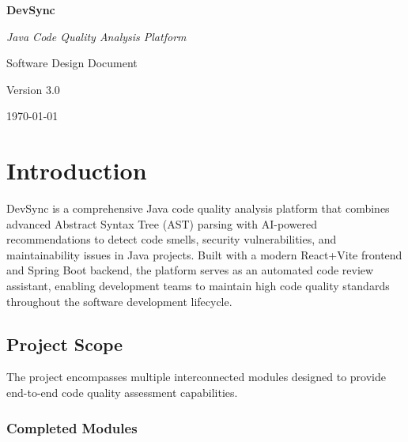 \documentclass[12pt,a4paper]{article}
\begin{document}
    \begin{titlepage}
        \centering
        \vspace*{2cm}
        {\Huge\bfseries DevSync\par}
        \vspace{0.5cm}
        {\Large\itshape Java Code Quality Analysis Platform\par}
        \vspace{2cm}
        {\large Software Design Document\par}
        \vspace{1cm}
        {\large Version 3.0\par}
        \vfill
        {\large \today\par}
    \end{titlepage}

    \tableofcontents
    \newpage

    \section{Introduction}

    DevSync is a comprehensive Java code quality analysis platform that combines advanced Abstract Syntax Tree (AST) parsing with AI-powered recommendations to detect code smells, security vulnerabilities, and maintainability issues in Java projects. Built with a modern React+Vite frontend and Spring Boot backend, the platform serves as an automated code review assistant, enabling development teams to maintain high code quality standards throughout the software development lifecycle.

    \subsection{Project Scope}

    The project encompasses multiple interconnected modules designed to provide end-to-end code quality assessment capabilities.

    \subsubsection{Completed Modules}
\end{document}
